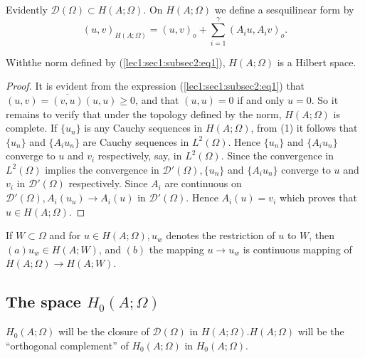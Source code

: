 Evidently $\mathscr{D}(\Omega)\subset H(A; \Omega)$. On $H(A;\Omega)$
we define a sesquilinear form by 
   \begin{equation}
     (u,v)_{H(A; \Omega)}= (u,v)_o + \sum ^\gamma _{i=1}(A_i u,A_i v)_o. \tag{1} 
     \label{lec1:sec1:subsec2:eq1}     
   \end{equation}

\begin{theorem}\label{lec1:sec1:subsec2:thm1.1} %
  With\pageoriginale the norm defined by (\ref{lec1:sec1:subsec2:eq1}), $H(A ; \Omega)$ is a Hilbert space.
\end{theorem}

\begin{proof}
  It is evident from the expression (\ref{lec1:sec1:subsec2:eq1}) that $(u,v)= \overline{(v, u)}   
  (u, u)\geq 0$, and that $(u,u) = 0$ if and only $u = 0$. So it remains
  to verify that under the topology defined by the norm, $H(A;\Omega)$
  is complete. If $\{ u_n \}$ is any Cauchy sequences in $H(A; \Omega)$,
  from (1) it follows that $\{ u_n \}$ and $\{A_i u_n \}$ are Cauchy
  sequences in $L^2(\Omega)$. Hence $\{ u_n \}$ and $\{A_i u_n \}$
  converge to $u$ and $v_i$ respectively, say, in $L^2(\Omega)$. Since
  the convergence in $L^2(\Omega)$ implies the convergence in
  $\mathscr{D}'(\Omega),\{ u_n \}$ and $\{A_i u_n \}$ converge to $u$
  and $v_i$ in $\mathscr{D}' (\Omega)$ respectively. Since $A_i$ are
  continuous on $\mathscr{D}'(\Omega), A_i (u_u) \to A_i(u)$ in
  $\mathscr{D}'(\Omega)$. Hence $A_i(u)=v_i$ which proves that $u
  \in H(A; \Omega)$. 
\end{proof}

\begin{proposition}\label{lec1:sec1:subsec2:prop1.1}%
If $W \subset \Omega$ and for $u \in H(A; \Omega),u_w$ denotes
the restriction of $u$ to $W$, then $(a)u_w \in H(A; W)$, and
$(b)$ the mapping $u \to u_w$ is continuous mapping of $H(A; \Omega)
\to H (A; W)$. 
\end{proposition}

\subsection{The space \texorpdfstring{$H_0(A; \Omega)$}{H0(AOmega)}}\label{lec1:sec1:subsec3}

\begin{definition}\label{lec1:sec1:subsec3:def1.2}%
$H_0(A ; \Omega)$ will be the closure of $\mathscr{D}(\Omega)$ in
  $H(A;\Omega).H(A;\Omega)$ will be the ``orthogonal complement'' of $H_0(A;
  \Omega)$ in $H_0(A; \Omega)$. 
\end{definition}

